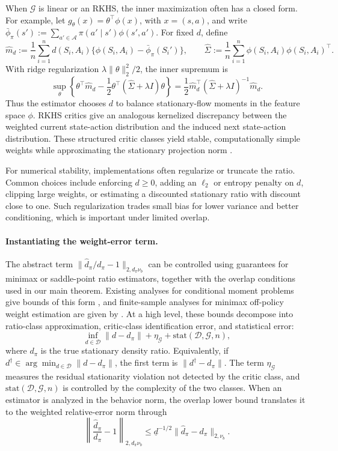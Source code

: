 \documentclass{article}
\theoremstyle{plain}
\theoremstyle{definition}
\theoremstyle{remark}
\begin{document}
When \(\mathcal G\) is linear or an RKHS, the inner maximization often has a
closed form. For example, let \(g_\theta(x)=\theta^\top\phi(x)\), with
\(x=(s,a)\), and write
\(\bar\phi_\pi(s'):=\sum_{a'\in\mathcal A}\pi(a'\mid s')\phi(s',a')\).
For fixed \(d\), define
\[
\widehat m_d
:=
\frac{1}{n}\sum_{i=1}^n
d(S_i,A_i)\{\phi(S_i,A_i)-\bar\phi_\pi(S_i')\},
\qquad
\widehat\Sigma
:=
\frac{1}{n}\sum_{i=1}^n
\phi(S_i,A_i)\phi(S_i,A_i)^\top.
\]
With ridge regularization \(\lambda\|\theta\|_2^2/2\), the inner supremum is
\[
\sup_\theta
\left\{
\theta^\top \widehat m_d
-
\frac{1}{2}\theta^\top(\widehat\Sigma+\lambda I)\theta
\right\}
=
\frac{1}{2}\widehat m_d^\top
(\widehat\Sigma+\lambda I)^{-1}
\widehat m_d.
\]
Thus the estimator chooses \(d\) to balance stationary-flow moments in the
feature space \(\phi\). RKHS critics give an analogous kernelized discrepancy
between the weighted current state-action distribution and the induced next
state-action distribution. These structured critic classes yield stable,
computationally simple weights while approximating the stationary projection
norm
\citep{dikkala2020minimax,uehara2020minimax,wang2023projected,
olivas2025source}.

For numerical stability, implementations often regularize or truncate the ratio.
Common choices include enforcing \(d\ge0\), adding an \(\ell_2\) or entropy
penalty on \(d\), clipping large weights, or estimating a discounted stationary
ratio with discount close to one. Such regularization trades small bias for
lower variance and better conditioning, which is important under limited
overlap.

\paragraph{Instantiating the weight-error term.}
The abstract term \(\|\widehat d_\pi/d_\pi-1\|_{2,d_\pi\nu_b}\) can be controlled
using guarantees for minimax or saddle-point ratio estimators, together with the
overlap conditions used in our main theorem. Existing analyses for conditional
moment problems give bounds of this form
\citep{dikkala2020minimax,bennett2023minimax,olivas2025source}, and
finite-sample analyses for minimax off-policy weight estimation are given by
\citet{uehara2020minimax,uehara2021finite,wang2023projected}. At a high level,
these bounds decompose into ratio-class approximation, critic-class
identification error, and statistical error:
\[
\inf_{d\in\mathcal D}\|d-d_\pi\|
+
\eta_{\mathcal G}
+
\mathrm{stat}(\mathcal D,\mathcal G,n),
\]
where \(d_\pi\) is the true stationary density ratio. Equivalently, if
\(d^\dagger\in\arg\min_{d\in\mathcal D}\|d-d_\pi\|\), the first term is
\(\|d^\dagger-d_\pi\|\). The term \(\eta_{\mathcal G}\) measures the residual
stationarity violation not detected by the critic class, and
\(\mathrm{stat}(\mathcal D,\mathcal G,n)\) is controlled by the complexity of
the two classes.
When an estimator is analyzed in the behavior norm, the overlap lower bound
translates it to the weighted relative-error norm through
\[
\left\|\frac{\widehat d_\pi}{d_\pi}-1\right\|_{2,d_\pi\nu_b}
\le
\underline d^{-1/2}
\|\widehat d_\pi-d_\pi\|_{2,\nu_b}.
\]
\end{document}
